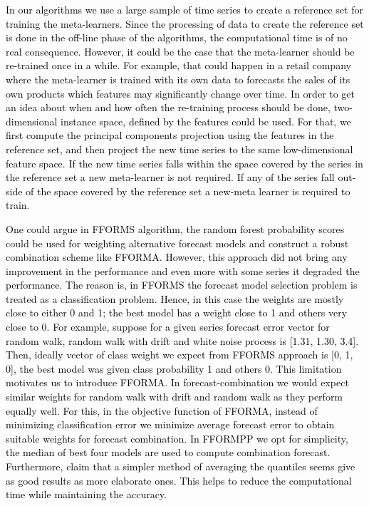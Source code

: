 \documentclass{monashthesis}
\begin{document}
\textcolor{black}{In our algorithms we use a large sample of time series to create a reference set for training the meta-learners. Since the processing of data to create the reference set is done in the off-line phase of the algorithms, the computational time is of no real consequence.  However, it could be the case that the meta-learner should be re-trained once in a while. For example, that could happen in a retail company where the meta-learner is trained with its own data to forecasts the sales of its own products which features may significantly change over time. In order to get an idea about when and how often the re-training process should be done, two-dimensional instance space, defined by the features could be used. For that, we first compute the principal components projection using the features in the reference set, and then project the new time series to the same low-dimensional feature space. If the new time series falls within the space covered by the series in the reference set a new meta-learner is not required. If any of the series fall out-side of the space covered by the reference set a new-meta learner is required to train.}

\textcolor{black}{One could argue in FFORMS algorithm, the random forest probability scores  could be used for weighting alternative forecast models and construct a robust combination scheme like FFORMA. However, this approach did not bring any improvement in the performance and even more with some series it degraded the performance. The reason is, in FFORMS the forecast model selection problem is treated as a classification problem. Hence, in this case the weights are mostly close to either 0 and 1; the best model has a weight close to 1 and others very close to 0. For example, suppose for a given series forecast error vector for random walk, random walk with drift and white noise process is [1.31, 1.30, 3.4]. Then, ideally vector of class weight we expect from FFORMS approach is [0, 1, 0], the best model was given class probability 1 and others 0. This limitation motivates us to introduce FFORMA. In forecast-combination we would expect similar weights for random walk with drift and random walk as they perform equally well. For this, in the objective function of FFORMA, instead of minimizing classification error we minimize average forecast error to obtain suitable weights for forecast combination.} \textcolor{black}{In FFORMPP we opt for simplicity, the median of best four models are used to compute combination forecast. Furthermore,} \textcite{lichtendahl2013better} \textcolor{black}{claim that a simpler method
of averaging the quantiles seems give as good results as more elaborate ones. This helps to reduce the computational time while maintaining the accuracy.}
\end{document}
